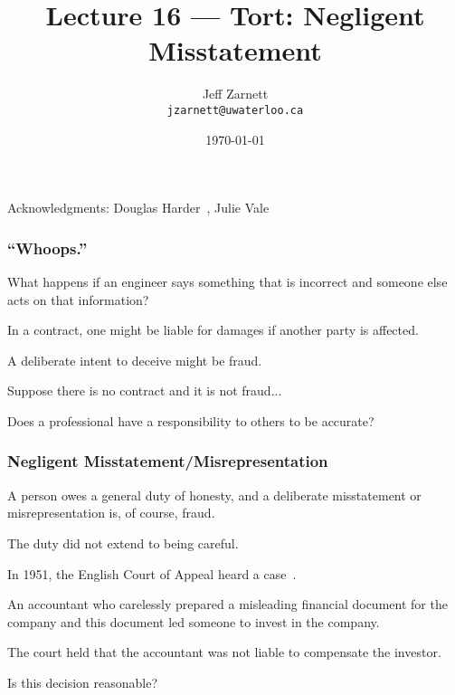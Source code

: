

\title{Lecture 16 --- Tort: Negligent Misstatement }

\author{Jeff Zarnett \\ \small \texttt{jzarnett@uwaterloo.ca}}
\date{\today}




\begin{frame}
  \titlepage

\begin{center}
  \small{Acknowledgments: Douglas Harder~\cite{dwh}, Julie Vale~\cite{jv}}
  \end{center}
\end{frame}




\begin{frame}
\frametitle{``Whoops.''}

What happens if an engineer says something that is incorrect and someone else acts on that information?

In a contract, one might be liable for damages if another party is affected.

A deliberate intent to deceive might be fraud.

Suppose there is no contract and it is not fraud...

Does a professional have a responsibility to others to be accurate?

\end{frame}



\begin{frame}
\frametitle{Negligent Misstatement/Misrepresentation}

A person owes a general duty of honesty, and a deliberate misstatement or misrepresentation is, of course, fraud.

The duty did not extend to being careful.

In 1951, the English Court of Appeal heard a case~\cite{lba}.

An accountant who carelessly prepared a misleading financial document for the company and this document led someone to invest in the company.

The court held that the accountant was not liable to compensate the investor. 

Is this decision reasonable?


\end{frame}



